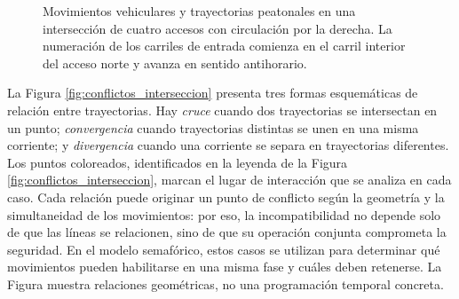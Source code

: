 \begin{figure}[!htbp]
{}
    \caption[Movimientos vehiculares y trayectorias peatonales sobre los carriles numerados de una intersección de cuatro accesos]{Movimientos vehiculares y trayectorias peatonales en una intersección de cuatro accesos con circulación por la derecha. La numeración de los carriles de entrada comienza en el carril interior del acceso norte y avanza en sentido antihorario.}
    \label{fig:movimientos_fases_interseccion}
\end{figure}

La Figura \ref{fig:conflictos_interseccion} presenta tres formas esquemáticas de relación entre trayectorias. Hay \textit{cruce} cuando dos trayectorias se intersectan en un punto; \textit{convergencia} cuando trayectorias distintas se unen en una misma corriente; y \textit{divergencia} cuando una corriente se separa en trayectorias diferentes. Los puntos coloreados, identificados en la leyenda de la Figura \ref{fig:conflictos_interseccion}, marcan el lugar de interacción que se analiza en cada caso. Cada relación puede originar un punto de conflicto según la geometría y la simultaneidad de los movimientos: por eso, la incompatibilidad no depende solo de que las líneas se relacionen, sino de que su operación conjunta comprometa la seguridad. En el modelo semafórico, estos casos se utilizan para determinar qué movimientos pueden habilitarse en una misma \gls{fase} y cuáles deben retenerse. La Figura muestra relaciones geométricas, no una programación temporal concreta.

